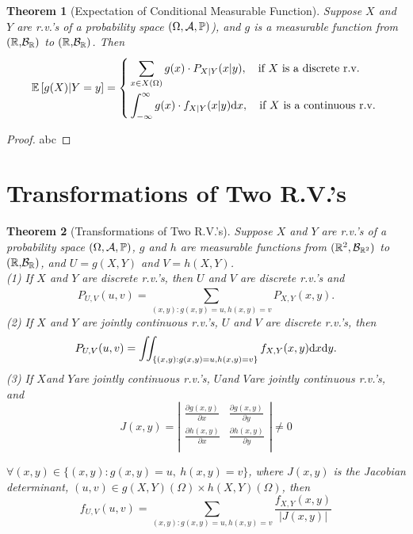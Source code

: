 \documentclass[openany,12pt]{book}
\newtheorem{theorem}{Theorem}[chapter]
\begin{document}
\begin{theorem}[Expectation of Conditional Measurable Function]
Suppose $X$ and $Y$ are r.v.'s of a probability space $(\Omega,\mathcal{A},\mathbb{P})$), and $g$ is a measurable function from $\mathbb{(R,}\mathcal{B}_{\mathbb{R}})$ to $\mathbb{(R,}\mathcal{B}_{\mathbb{R}})$. Then
\[\mathbb{E}\left[ g(X) | Y = y \right] = \left\{ \begin{aligned}
&\sum_{x \in X(\Omega)}^{}{g(x) \cdot P_{X|Y}(x|y),\quad \mathrm{\text{if\ }}X\mathrm{\text{\ is\ a\ discrete\ r.v.}}} \\
&\int_{- \infty}^{\infty}g(x) \cdot f_{X|Y}(x|y)\mathrm{d} x,\quad\mathrm{\text{if\ }}X\mathrm{\text{\ is\ a\ continuous\ r.v.}} \\
\end{aligned} \right.\ \]
\end{theorem}

\begin{proof}
  abc
\end{proof}

\section{Transformations of Two R.V.'s}

\begin{theorem}[Transformations of Two R.V.'s]
Suppose $X$ and $Y$ are r.v.'s of a probability space $(\Omega,\mathcal{A},\mathbb{P})$, $g$ and $h$ are measurable functions from $(\mathbb{R}^{2},\mathcal{B}_{\mathbb{R}^{2}})$ to $\mathbb{(R,}\mathcal{B}_{\mathbb{R}})$, and $U = g(X,Y)$ and $V = h(X,Y)$.\\
(1) If $X$ and $Y$ are discrete r.v.'s, then $U$ and $V$ are discrete r.v.'s and
\[P_{U,V}(u,v) = \sum_{(x,y):g(x,y) = u,h(x,y) = v}^{}{P_{X,Y}(x,y)}.\]
(2) If $X$ and $Y$ are jointly continuous r.v.'s, $U$ and $V$ are discrete r.v.'s, then
\[P_{U,V}(u,v) = \iint_{\{(x,y):g(x,y) = u,h(x,y) = v\}}^{}{f_{X,Y}(x,y)\mathrm{d} x\mathrm{d} y.}\]
(3) If $X$and $Y$are jointly continuous r.v.'s, $U$and $V$are jointly continuous r.v.'s, and
\[J(x,y) = \left| \begin{matrix}
\frac{\partial g(x,y)}{\partial x} & \frac{\partial g(x,y)}{\partial y} \\
\frac{\partial h(x,y)}{\partial x} & \frac{\partial h(x,y)}{\partial y} \\
\end{matrix} \right| \neq 0\]

$\forall(x,y) \in \{(x,y):g(x,y) = u,\ h(x,y) = v\}$, where $J(x,y)$ is the Jacobian determinant, $(u,v) \in g(X,Y)(\Omega) \times h(X,Y)(\Omega)$, then
\[f_{U,V}(u,v) = \sum_{(x,y):g(x,y) = u,h(x,y) = v}^{}\frac{f_{X,Y}(x,y)}{|J(x,y)|}\]
\end{theorem}
\end{document}
